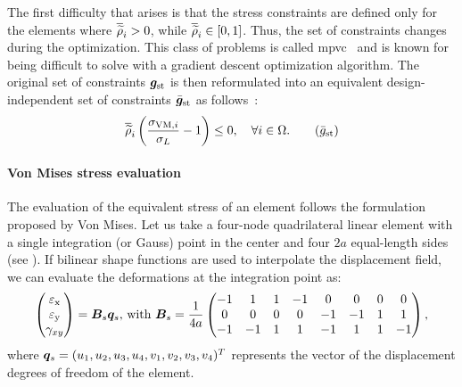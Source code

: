 The first difficulty that arises is that the stress constraints are defined only for the elements where $\overline{\widetilde{\rho}}_i > 0$, while $\overline{\widetilde{\rho}}_i\in[0,1]$. Thus, the set of constraints changes during the optimization. This class of problems is called \acrfull{mpvc}~ and is known for being difficult to solve with a gradient descent optimization algorithm. The original set of constraints $\bm{g}_{\text{st}}$ is then reformulated into an equivalent design-independent set of constraints $\bar{\bm{g}}_{\text{st}}$ as follows~:
\begin{equation}
    \rhophys_i\left(\frac{ \sigma_{\text{VM},i}}{\sigma_L}-1 \right) \leq 0, \quad \forall i \in \Omega.
    \tag{$\bar{g}_{\text{st}}$}
\end{equation}
\paragraph{Von Mises stress evaluation}
The evaluation of the equivalent stress of an element follows the formulation proposed by Von Mises. Let us take a four-node quadrilateral linear element with a single integration (or Gauss) point in the center and four $2a$ equal-length sides (see ). If bilinear shape functions are used to interpolate the displacement field, we can evaluate the deformations at the integration point as:
\begin{equation}
    \begin{pmatrix}
    \varepsilon_\text{x} \\
    \varepsilon_\text{y} \\
    \gamma_{xy}
    \end{pmatrix} = \bm{B}_s\bm{q}_s
    \textrm{,  with }
    \bm{B}_s =
    \frac{1}{4a}
    \begin{pmatrix}
    -1  &   1   &   1   &   -1  &   0   &   0   &   0   &   0   \\
    0   &   0   &   0   &   0   &   -1  &   -1  &   1   &   1   \\
    -1  &   -1  &   1   &   1   &   -1  &   1   &   1   &   -1
    \end{pmatrix},
\end{equation}
where $\bm{q}_s = (u_1, u_2, u_3, u_4, v_1, v_2, v_3, v_4)^T$ represents the vector of the displacement degrees of freedom of the element. 

